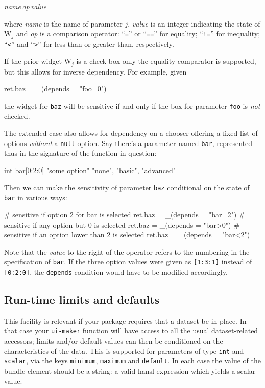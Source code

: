 \documentclass[oneside]{book}
\begin{document}
\qquad \textsl{name}\,\textsl{op}\,\textsl{value}

where \textsl{name} is the name of parameter $j$, \textsl{value} is an
integer indicating the state of \textsf{W}$_j$ and \textsl{op} is a
comparison operator: ``\texttt{=}'' or ``\texttt{==}'' for equality;
``\texttt{!=}'' for inequality; ``\texttt{<}'' and ``\texttt{>}'' for
less than or greater than, respectively.

If the prior widget \textsf{W}$_j$ is a check box only the equality
comparator is supported, but this allows for inverse dependency. For
example, given
\begin{code}
ret.baz = _(depends = "foo=0")
\end{code}
the widget for \texttt{baz} will be sensitive if and only if the box
for parameter \texttt{foo} is \textit{not} checked.

The extended case also allows for dependency on a chooser offering a
fixed list of options \textit{without} a \texttt{null} option. Say
there's a parameter named \texttt{bar}, represented thus in the
signature of the function in question:
\begin{code}
int bar[0:2:0] "some option" {"none", "basic", "advanced"}
\end{code}
Then we can make the sensitivity of parameter \texttt{baz} conditional
on the state of \texttt{bar} in various ways:
\begin{code}
# sensitive if option 2 for bar is selected
ret.baz = _(depends = "bar=2")
# sensitive if any option but 0 is selected
ret.baz = _(depends = "bar>0")
# sensitive if an option lower than 2 is selected
ret.baz = _(depends = "bar<2")
\end{code}
Note that the \textsl{value} to the right of the operator refers to
the numbering in the specification of \texttt{bar}. If the three
option values were given as \texttt{[1:3:1]} instead of
\texttt{[0:2:0]}, the \texttt{depends} condition would have to be
modified accordingly.

\subsection{Run-time limits and defaults}

This facility is relevant if your package requires that a dataset be
in place. In that case your \texttt{ui-maker} function will have
access to all the usual dataset-related accessors; limits and/or
default values can then be conditioned on the characteristics of the
data. This is supported for parameters of type \texttt{int} and
\texttt{scalar}, via the keys \texttt{minimum}, \texttt{maximum} and
\texttt{default}. In each case the value of the bundle element should
be a string: a valid hansl expression which yields a scalar value.
\end{document}
